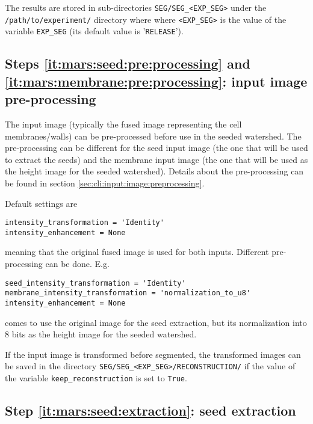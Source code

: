 The results are stored in sub-directories
\texttt{SEG/SEG\_<EXP\_SEG>} under the
\texttt{/path/to/experiment/} directory where where \texttt{<EXP\_SEG>} is the value of the variable \texttt{EXP\_SEG} (its
default value is '\texttt{RELEASE}'). 





\subsection{Steps \ref{it:mars:seed:pre:processing} and \ref{it:mars:membrane:pre:processing}: input image pre-processing}
\label{sec:cli:mars:input:images}


The input image (typically the fused image representing the cell membranes/walls) can be pre-processed before use in the seeded watershed.
The pre-processing can be different for the seed input image (the one that will be used to extract the seeds) and the membrane input image (the one that will be used as the height image for the seeded watershed).
Details about the pre-processing can be found in section \ref{sec:cli:input:image:preprocessing}.

Default settings are
\begin{verbatim}
intensity_transformation = 'Identity'
intensity_enhancement = None
\end{verbatim}
meaning that the original fused image is used for both inputs. Different pre-processing can be done. E.g.
\begin{verbatim}
seed_intensity_transformation = 'Identity'
membrane_intensity_transformation = 'normalization_to_u8'
intensity_enhancement = None
\end{verbatim}
comes to use the original image for the seed extraction, but its normalization into 8 bits as the height image for the seeded watershed.

If the input image is transformed before segmented, the transformed images can be saved in the directory \texttt{SEG/SEG\_<EXP\_SEG>/RECONSTRUCTION/} if the value of the variable \texttt{keep\_reconstruction} is set to \texttt{True}.

\subsection{Step \ref{it:mars:seed:extraction}: seed extraction}
\label{sec:cli:mars:seed:extraction}

